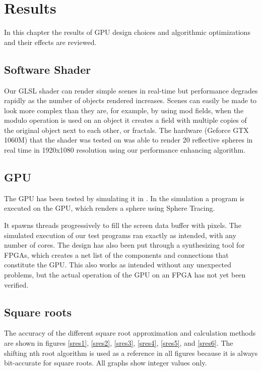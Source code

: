 \chapter{Results}

	In this chapter the results of GPU design choices and algorithmic
	optimizations and their effects are reviewed.

	\section{Software Shader}

		Our GLSL shader can render simple scenes in real-time but
		performance degrades rapidly as the number of objects rendered increases.
		Scenes can easily be made to look more complex than they are, for 
		example, by using mod fields, when the modulo operation is used on an object it creates a field with multiple copies of the original object next to each other, or fractals. The hardware (Geforce GTX 1060M) that the shader was tested 
		on was able to render 20 reflective spheres in real time in 1920x1080 
		resolution using our performance enhancing algorithm.

 
	\section{GPU}
	
		The GPU has been tested by simulating it in \clash. In the simulation a program is executed on the GPU, which renders a sphere using Sphere Tracing. 

		It spawns threads
		progressively to fill the screen data buffer with pixels. The simulated execution
		of our test programs ran exactly as intended, with any number of
		cores. The design has also been put through a synthesizing
		tool for FPGAs, which creates a net list of the components and
		connections that constitute the GPU. This also works as intended
		without any unexpected problems, but the actual operation of the GPU on
		an FPGA has not yet been verified.
	
	\section{Square roots}
		
		The accuracy of the different square root approximation and calculation
		methods are shown in figures \ref{sres1}, \ref{sres2}, \ref{sres3},
		\ref{sres4}, \ref{sres5}, and \ref{sres6}. The shifting nth root
		algorithm is used as a reference in all figures because it is always
		bit-accurate for square roots. All graphs show integer values only.

